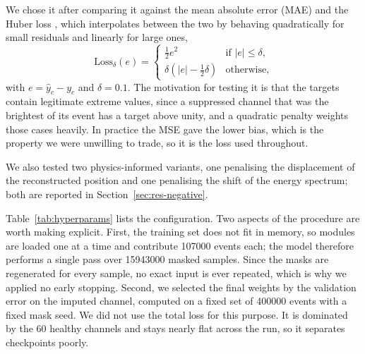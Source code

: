 \documentclass[10pt,conference]{IEEEtran}
\begin{document}
We chose it after comparing it against the mean absolute error (MAE) and the
Huber loss \cite{huber1964}, which interpolates between the two by behaving
quadratically for small residuals and linearly for large ones,
%
\begin{equation}
\mathrm{Loss}_{\delta}(e) =
\begin{cases}
\tfrac{1}{2} e^{2} & \text{if } \lvert e \rvert \le \delta, \\[2pt]
\delta \left( \lvert e \rvert - \tfrac{1}{2}\delta \right) & \text{otherwise,}
\end{cases}
\label{eq:huber}
\end{equation}
%
with $e = \hat{y}_{c} - y_{c}$ and $\delta = 0.1$. The motivation for testing it
is that the targets contain legitimate extreme values, since a suppressed
channel that was the brightest of its event has a target above unity, and a
quadratic penalty weights those cases heavily. In practice the MSE gave the
lower bias, which is the property we were unwilling to trade, so it is the loss
used throughout.

We also tested two physics-informed variants, one penalising the displacement
of the reconstructed position and one penalising the shift of the energy
spectrum; both are reported in Section~\ref{sec:res-negative}.

Table~\ref{tab:hyperparams} lists the configuration. Two aspects of the
procedure are worth making explicit. First, the training set does not fit in
memory, so modules are loaded one at a time and contribute \num{107000} events
each; the model therefore performs a single pass over \num{15943000} masked
samples. Since the masks are regenerated for every sample, no exact input is
ever repeated, which is why we applied no early stopping. Second, we selected
the final weights by the validation error on the imputed channel, computed on
a fixed set of \num{400000} events with a fixed mask seed. We did not use the
total loss for this purpose. It is dominated by the 60 healthy channels and
stays nearly flat across the run, so it separates checkpoints poorly.
\end{document}
